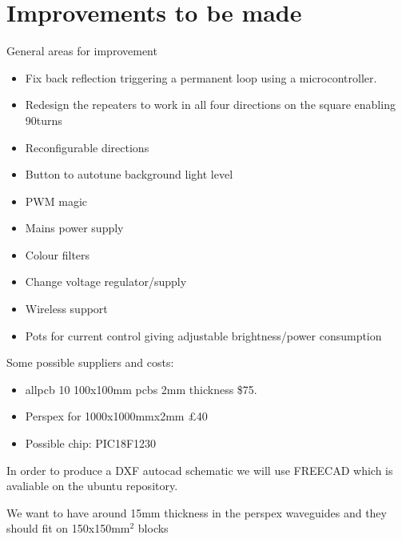 \documentclass[12pt]{article}
\begin{document}
\newpage
\section{Improvements to be made}

General areas for improvement
\begin{itemize}
	\item Fix back reflection triggering a permanent loop using a microcontroller.
	\item Redesign the repeaters to work in all four directions on the square enabling 90\degree turns 
	\item Reconfigurable directions
	\item Button to autotune background light level
	\item PWM magic
	\item Mains power supply 
	\item Colour filters
	\item Change voltage regulator/supply
	\item Wireless support
	\item Pots for current control giving adjustable brightness/power consumption	
\end{itemize}
Some possible suppliers and costs:
\begin{itemize}
	\item allpcb 10 100x100mm pcbs 2mm thickness \$75.
	\item Perspex for 1000x1000mmx2mm £40
        \item Possible chip: PIC18F1230
\end{itemize}

In order to produce a DXF autocad schematic we will use FREECAD which is avaliable on the ubuntu repository.

We want to have around 15mm thickness in the perspex waveguides and they should fit on 150x150mm$^2$ blocks
\end{document}
